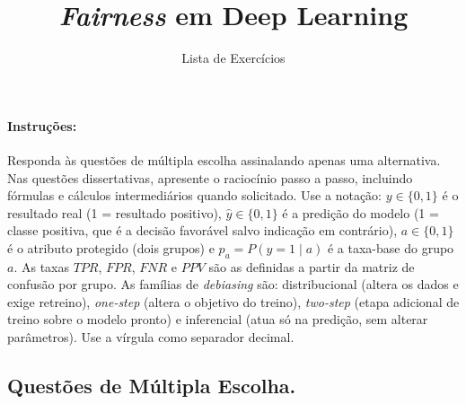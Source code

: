 \documentclass{dlproblemset}
\title{\textit{Fairness} em Deep Learning}
\subtitle{Lista de Exercícios}
\begin{document}
\paragraph{Instruções:} Responda às questões de múltipla escolha assinalando apenas uma alternativa. Nas questões dissertativas, apresente o raciocínio passo a passo, incluindo fórmulas e cálculos intermediários quando solicitado. Use a notação: $y \in \{0,1\}$ é o resultado real (1 = resultado positivo), $\hat{y} \in \{0,1\}$ é a predição do modelo (1 = classe positiva, que é a decisão favorável salvo indicação em contrário), $a \in \{0,1\}$ é o atributo protegido (dois grupos) e $p_a = P(y{=}1 \mid a)$ é a taxa-base do grupo $a$. As taxas $TPR$, $FPR$, $FNR$ e $PPV$ são as definidas a partir da matriz de confusão por grupo. As famílias de \textit{debiasing} são: distribucional (altera os dados e exige retreino), \textit{one-step} (altera o objetivo do treino), \textit{two-step} (etapa adicional de treino sobre o modelo pronto) e inferencial (atua só na predição, sem alterar parâmetros). Use a vírgula como separador decimal.

\subsection*{Questões de Múltipla Escolha.}
\end{document}
